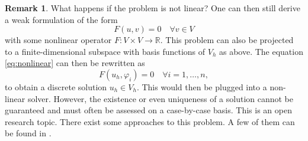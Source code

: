 \documentclass[12pt,a4paper,twoside, open=right]{scrreprt}
\theoremstyle{definition}
\newtheorem{rem}[auf]{Remark}
\theoremstyle{plain}
\newcommand{\rr}{\mathbb{R}}
\begin{document}
\begin{rem}
    What happens if the problem is not linear? One can then still derive a weak formulation of the form
    \begin{equation}
        F(u,v) = 0 \quad\forall v \in V\label{eq:nonlinear}
    \end{equation}
    with some nonlinear operator $F:V\times V\to\rr$.
    This problem can also be projected to a finite-dimensional subspace with basis functions of $V_h$ as above. The equation \eqref{eq:nonlinear} can then be rewritten as 
    \begin{equation}
        F(u_h, \varphi_i) = 0 \quad \forall i=1,\dotsc,n,
    \end{equation}
    to obtain a discrete solution $u_h\in V_h$. This would then be plugged into a non-linear solver. However, the existence or even uniqueness of a solution cannot be guaranteed and must often be assessed on a case-by-case basis. This is an open research topic. There exist some approaches to this problem. A few of them can be found in \cite{Girault1986}.
\end{rem}
\end{document}
